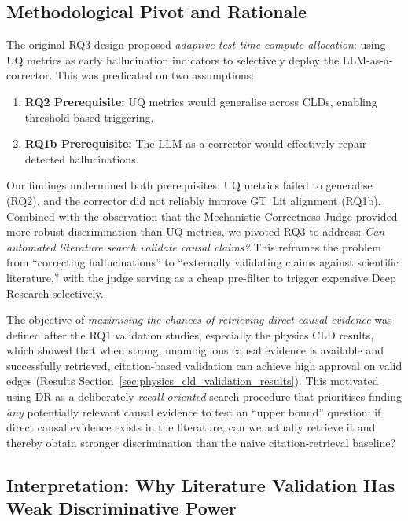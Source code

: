\subsection{Methodological Pivot and Rationale}

The original RQ3 design proposed \textit{adaptive test-time compute allocation}: using UQ metrics as early hallucination indicators to selectively deploy the LLM-as-a-corrector. This was predicated on two assumptions:
\begin{enumerate}[noitemsep]
    \item \textbf{RQ2 Prerequisite:} UQ metrics would generalise across CLDs, enabling threshold-based triggering.
    \item \textbf{RQ1b Prerequisite:} The LLM-as-a-corrector would effectively repair detected hallucinations.
\end{enumerate}
Our findings undermined both prerequisites: UQ metrics failed to generalise (RQ2), and the corrector did not reliably improve GT~Lit alignment (RQ1b). Combined with the observation that the Mechanistic Correctness Judge provided more robust discrimination than UQ metrics, we pivoted RQ3 to address: \textit{Can automated literature search validate causal claims?} This reframes the problem from ``correcting hallucinations'' to ``externally validating claims against scientific literature,'' with the judge serving as a cheap pre-filter to trigger expensive Deep Research selectively.

The objective of \emph{maximising the chances of retrieving direct causal evidence} was defined after the RQ1 validation studies, especially the physics CLD results, which showed that when strong, unambiguous causal evidence is available and successfully retrieved, citation-based validation can achieve high approval on valid edges (Results Section~\ref{sec:physics_cld_validation_results}). This motivated using DR as a deliberately \textit{recall-oriented} search procedure that prioritises finding \emph{any} potentially relevant causal evidence to test an ``upper bound'' question: if direct causal evidence exists in the literature, can we actually retrieve it and thereby obtain stronger discrimination than the naive citation-retrieval baseline?

\subsection{Interpretation: Why Literature Validation Has Weak Discriminative Power}

